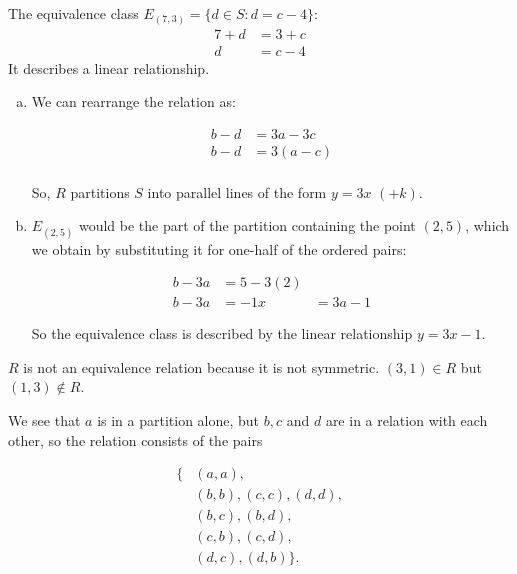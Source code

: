 \documentclass[12pt]{scrartcl} %
\begin{document}
The equivalence class $E_{(7,3)} = \{d \in S: d = c-4\}$:
\begin{align*}
7 + d &= 3 + c \\
d &= c - 4
\end{align*}
It describes a linear relationship.


\begin{enumerate}[(a)]

\item We can rearrange the relation as:

\begin{align*}
b-d &= 3a - 3c \\
b-d &= 3(a-c) \\
\end{align*}

So, $R$ partitions $S$ into parallel lines of the form $y = 3x$ $(+ k)$.

\item $E_{(2,5)}$ would be the part of the partition containing the point $(2,5)$, which we obtain by substituting it for one-half of the ordered pairs:

\begin{align*}
b-3a &= 5 - 3(2) \\
b-3a &= -1
x &= 3a -1
\end{align*}

So the equivalence class is described by the linear relationship $y = 3x -1$.
\end{enumerate}


$R$ is not an equivalence relation because it is not symmetric. $(3,1) \in R$ but $(1,3) \notin R$.


We see that $a$ is in a partition alone, but $b, c$ and $d$ are in a relation with each other, so the relation consists of the pairs

\begin{align*}
\{ &(a,a), \\
&(b,b), (c,c), (d,d), \\
&(b,c), (b,d), \\
&(c,b), (c,d), \\
&(d,c), (d,b) \}.
\end{align*}
\end{document}
